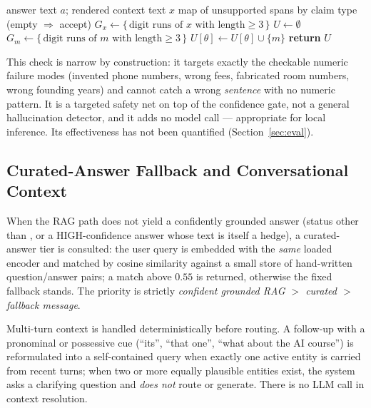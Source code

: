 \begin{algorithm}[!t]
\caption{Grounding-Based Claim Verification}
\label{alg:grounding}
\begin{algorithmic}[1]
\Require answer text $a$; rendered context text $x$
\Ensure map of unsupported spans by claim type (empty $\Rightarrow$ accept)
\State $G_x \gets \{\,\text{digit runs of } x \text{ with length} \ge 3\,\}$
\State $U \gets \emptyset$
     \State $G_m \gets \{\,\text{digit runs of } m \text{ with length} \ge 3\,\}$
        \State $U[\theta] \gets U[\theta] \cup \{m\}$
     \EndIf
  \EndFor
\EndFor
\State \textbf{return} $U$
\end{algorithmic}
\end{algorithm}

This check is narrow by construction: it targets exactly the checkable
numeric failure modes (invented phone numbers, wrong fees, fabricated room
numbers, wrong founding years) and cannot catch a wrong \emph{sentence}
with no numeric pattern. It is a targeted safety net on top of the
confidence gate, not a general hallucination detector, and it adds no model
call --- appropriate for local inference. Its effectiveness has not been
quantified (Section~\ref{sec:eval}).

\subsection{Curated-Answer Fallback and Conversational Context}
When the RAG path does not yield a confidently grounded answer
(status other than , or a HIGH-confidence answer whose text
is itself a hedge), a curated-answer tier is consulted: the user query is
embedded with the \emph{same} loaded encoder and matched by cosine
similarity against a small store of hand-written question/answer pairs; a
match above $0.55$ is returned, otherwise the fixed fallback stands. The
priority is strictly \emph{confident grounded RAG $>$ curated $>$ fallback
message}.

Multi-turn context is handled deterministically before routing. A
follow-up with a pronominal or possessive cue (``its'', ``that one'',
``what about the AI course'') is reformulated into a self-contained query
when exactly one active entity is carried from recent turns; when two or
more equally plausible entities exist, the system asks a clarifying
question and \emph{does not} route or generate. There is no LLM call in
context resolution.
